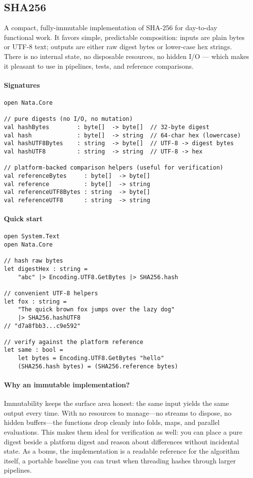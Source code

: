 \documentclass{article}
\begin{document}
\subsection{SHA256}

\noindent A compact, fully-immutable implementation of SHA-256 for day-to-day functional work. It favors simple, predictable composition: inputs are plain bytes or UTF-8 text; outputs are either raw digest bytes or lower-case hex strings. There is no internal state, no disposable resources, no hidden I/O — which makes it pleasant to use in pipelines, tests, and reference comparisons.

\paragraph{Signatures}
\begin{verbatim}
open Nata.Core

// pure digests (no I/O, no mutation)
val hashBytes        : byte[]  -> byte[]  // 32-byte digest
val hash             : byte[]  -> string  // 64-char hex (lowercase)
val hashUTF8Bytes    : string  -> byte[]  // UTF-8 -> digest bytes
val hashUTF8         : string  -> string  // UTF-8 -> hex

// platform-backed comparison helpers (useful for verification)
val referenceBytes     : byte[]  -> byte[]
val reference          : byte[]  -> string
val referenceUTF8Bytes : string  -> byte[]
val referenceUTF8      : string  -> string
\end{verbatim}

\paragraph{Quick start}
\begin{verbatim}
open System.Text
open Nata.Core

// hash raw bytes
let digestHex : string =
    "abc" |> Encoding.UTF8.GetBytes |> SHA256.hash

// convenient UTF-8 helpers
let fox : string =
    "The quick brown fox jumps over the lazy dog"
    |> SHA256.hashUTF8
// "d7a8fbb3...c9e592"

// verify against the platform reference
let same : bool =
    let bytes = Encoding.UTF8.GetBytes "hello"
    (SHA256.hash bytes) = (SHA256.reference bytes)
\end{verbatim}

\paragraph{Why an immutable implementation?}
Immutability keeps the surface area honest: the same input yields the same output every time. With no resources to manage—no streams to dispose, no hidden buffers—the functions drop cleanly into folds, maps, and parallel evaluations. This makes them ideal for verification as well: you can place a pure digest beside a platform digest and reason about differences without incidental state. As a bonus, the implementation is a readable reference for the algorithm itself, a portable baseline you can trust when threading hashes through larger pipelines.
\end{document}
